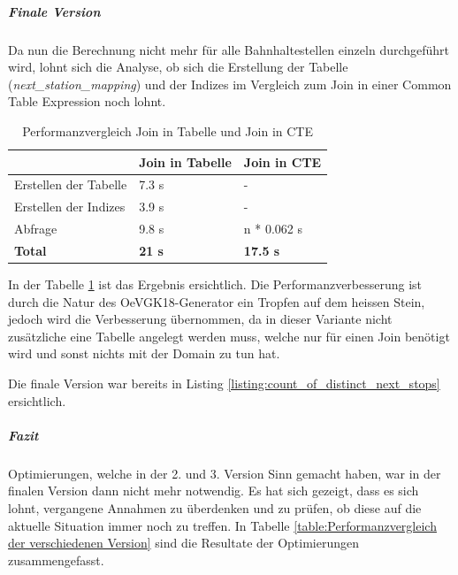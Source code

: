 \subparagraph{Finale Version}
Da nun die Berechnung nicht mehr für alle Bahnhaltestellen einzeln durchgeführt wird, lohnt sich die Analyse, ob sich die Erstellung der Tabelle (\emph{next\_station\_mapping}) und der Indizes im Vergleich zum Join in einer Common Table Expression noch lohnt.

\begin{table}[ht]
    \centering
    \begin{tabular}[ht]{l l l}
        \toprule
        \textbf{} 
                                & \textbf{Join in Tabelle}
                                & \textbf{Join in CTE}\\
        \midrule
        Erstellen der Tabelle
                                & 7.3 s
                                & - \\
        Erstellen der Indizes
                                & 3.9 s
                                & - \\
        Abfrage
                                & 9.8 s
                                & n * 0.062 s\\
        \textbf{Total}
                                & \textbf{21 s}
                                & \textbf{17.5 s}\\            
        \bottomrule
    \end{tabular}
    \caption{Performanzvergleich Join in Tabelle und Join in CTE}
    \label{table:Performanzvergleich Join in Tabelle und Join in CTE}
\end{table}

In der Tabelle \ref{table:Performanzvergleich Join in Tabelle und Join in CTE} ist das Ergebnis ersichtlich.
Die Performanzverbesserung ist durch die Natur des OeVGK18-Generator ein Tropfen auf dem heissen Stein, jedoch wird die Verbesserung übernommen, da in dieser Variante nicht zusätzliche eine Tabelle angelegt werden muss, welche nur für einen Join benötigt wird und sonst nichts mit der Domain zu tun hat.

Die finale Version war bereits in Listing \ref{listing:count_of_distinct_next_stops} ersichtlich.

\subparagraph{Fazit}
Optimierungen, welche in der 2. und 3. Version Sinn gemacht haben, war in der finalen Version dann nicht mehr notwendig.
Es hat sich gezeigt, dass es sich lohnt, vergangene Annahmen zu überdenken und zu prüfen, ob diese auf die aktuelle Situation immer noch zu treffen.
In Tabelle \ref{table:Performanzvergleich der verschiedenen Version} sind die Resultate der Optimierungen zusammengefasst.


